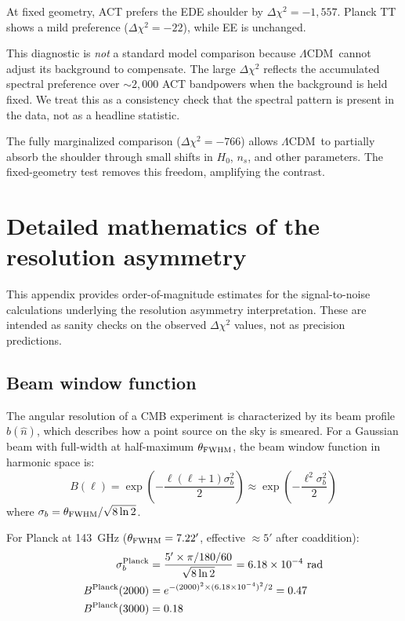 \documentclass[twocolumn,showpacs,preprintnumbers,amsmath,amssymb,prd]{revtex4-2}
\newcommand{\lcdm}{$\Lambda$CDM}
\begin{document}
At fixed geometry, ACT prefers the EDE shoulder by $\Delta\chi^2 = -1{,}557$. 
Planck TT shows a mild preference ($\Delta\chi^2 = -22$), while EE is unchanged.

This diagnostic is \emph{not} a standard model comparison because \lcdm\ cannot 
adjust its background to compensate. The large $\Delta\chi^2$ reflects the 
accumulated spectral preference over $\sim 2{,}000$ ACT bandpowers when the 
background is held fixed. We treat this as a consistency check that the 
spectral pattern is present in the data, not as a headline statistic.

The fully marginalized comparison ($\Delta\chi^2 = -766$) allows \lcdm\ to 
partially absorb the shoulder through small shifts in $H_0$, $n_s$, and other 
parameters. The fixed-geometry test removes this freedom, amplifying the contrast.

\section{Detailed mathematics of the resolution asymmetry}
\label{app:math}

This appendix provides order-of-magnitude estimates for the signal-to-noise 
calculations underlying the resolution asymmetry interpretation. These are 
intended as sanity checks on the observed $\Delta\chi^2$ values, not as 
precision predictions.

\subsection{Beam window function}

The angular resolution of a CMB experiment is characterized by its beam profile 
$b(\hat n)$, which describes how a point source on the sky is smeared. For a 
Gaussian beam with full-width at half-maximum $\theta_{\rm FWHM}$, the beam 
window function in harmonic space is:
\begin{equation}
B(\ell) = \exp\left(-\frac{\ell(\ell+1)\sigma_b^2}{2}\right) 
\approx \exp\left(-\frac{\ell^2\sigma_b^2}{2}\right)
\end{equation}
where $\sigma_b = \theta_{\rm FWHM}/\sqrt{8\ln 2}$.

For Planck at 143~GHz ($\theta_{\rm FWHM} = 7.22'$, effective $\approx 5'$ 
after coaddition):
\begin{align}
\sigma_b^{\rm Planck} &= \frac{5' \times \pi/180/60}{\sqrt{8\ln 2}} 
= 6.18 \times 10^{-4}~\text{rad} \\
B^{\rm Planck}(2000) &= e^{-(2000)^2 \times (6.18\times 10^{-4})^2/2} = 0.47 \\
B^{\rm Planck}(3000) &= 0.18
\end{align}
\end{document}
